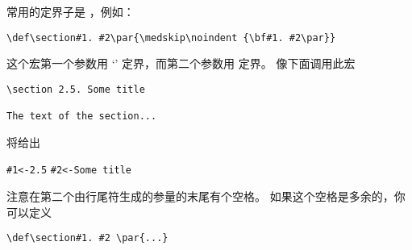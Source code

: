 \documentclass[letterpaper]{book}
\begin{document}
常用的定界子是 ，例如：
\begin{verbatim}
\def\section#1. #2\par{\medskip\noindent {\bf#1. #2\par}}
\end{verbatim}
这个宏第一个参数用 `' 定界，而第二个参数用  定界。
像下面调用此宏
\begin{verbatim}
\section 2.5. Some title

The text of the section...
\end{verbatim}
将给出
\begin{disp}\verb>#1<-2.5>\nl
\verb>#2<-Some title>\end{disp}
注意在第二个由行尾符生成的参量的末尾有个空格。
如果这个空格是多余的，你可以定义
\begin{verbatim}
\def\section#1. #2 \par{...}
\end{verbatim}
\end{document}
